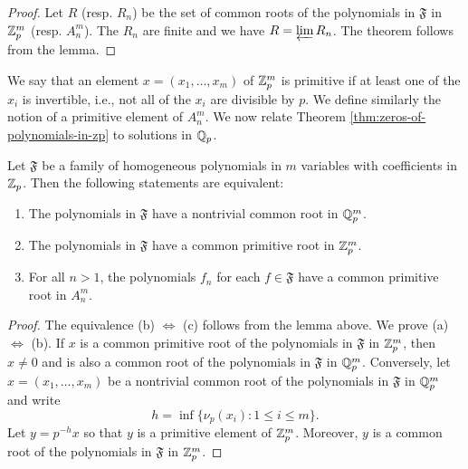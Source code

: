 \begin{proof}
    Let \(R\) (resp. \(R_n\)) be the set of common roots of the polynomials in \(\mathfrak{F}\) in \(\mathbb{Z}_p^m\) (resp. \(A_n^m\)). The \(R_n\) are finite and we have \(R = \varprojlim R_n\). The theorem follows from the lemma.
\end{proof}

We say that an element \(x = (x_1, \dots, x_m)\) of \(\mathbb{Z}_p^m\) is primitive if at least one of the \(x_i\) is invertible, i.e., not all of the \(x_i\) are divisible by \(p\). We define similarly the notion of a primitive element of \(A_n^m\). We now relate Theorem \ref{thm:zeros-of-polynomials-in-zp} to solutions in \(\mathbb{Q}_p\).

\begin{theoremx}
    Let \(\mathfrak{F}\) be a family of homogeneous polynomials in \(m\) variables with coefficients in \(\mathbb{Z}_p\). Then the following statements are equivalent:

    \smallskip

    \begin{enumerate}[nosep, label=(\alph*)]
        \item The polynomials in \(\mathfrak{F}\) have a nontrivial common root in \(\mathbb{Q}_p^m\).
        \item The polynomials in \(\mathfrak{F}\) have a common primitive root in \(\mathbb{Z}_p^m\).
        \item For all \(n > 1\), the polynomials \(f_n\) for each \(f \in \mathfrak{F}\) have a common primitive root in \(A_n^m\).
    \end{enumerate}
\end{theoremx}

\begin{proof}
    The equivalence (b) \(\iff\) (c) follows from the lemma above. We prove (a) \(\iff\) (b). If \(x\) is a common primitive root of the polynomials in \(\mathfrak{F}\) in \(\mathbb{Z}_p^m\), then \(x \neq 0\) and is also a common root of the polynomials in \(\mathfrak{F}\) in \(\mathbb{Q}_p^m\). Conversely, let \(x = (x_1, \dots, x_m)\) be a nontrivial common root of the polynomials in \(\mathfrak{F}\) in \(\mathbb{Q}_p^m\) and write
    \[
      h = \inf\{\nu_p(x_i) : 1 \leq i \leq m\}.
    \]
    Let \(y = p^{-h}x\) so that \(y\) is a primitive element of \(\mathbb{Z}_p^m\). Moreover, \(y\) is a common root of the polynomials in \(\mathfrak{F}\) in \(\mathbb{Z}_p^m\).
\end{proof}

